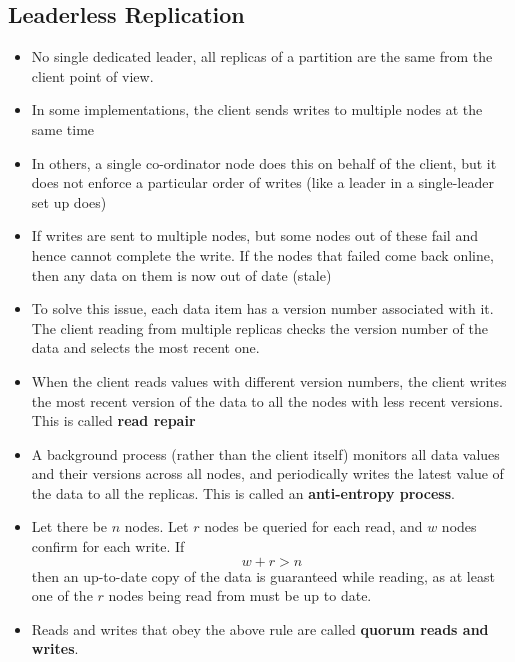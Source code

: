 \documentclass{article}
\begin{document}
\subsection{Leaderless Replication}
\begin{itemize}
    \item No single dedicated leader, all replicas of a partition are the same from the client point of view.
    
    \item In some implementations, the client sends writes to multiple nodes at the same time
    
    \item In others, a single co-ordinator node does this on behalf of the client, but it does not enforce a particular order of writes (like a leader in a single-leader set up does)
    
    \item If writes are sent to multiple nodes, but some nodes out of these fail and hence cannot complete the write. If the nodes that failed come back online, then any data on them is now out of date (stale)
    
    \item To solve this issue, each data item has a version number associated with it. The client reading from multiple replicas checks the version number of the data and selects the most recent one. 
    
    \item When the client reads values with different version numbers, the client writes the most recent version of the data to all the nodes with less recent versions. This is called \textbf{read repair}
    
    \item A background process (rather than the client itself) monitors all data values and their versions across all nodes, and periodically writes the latest value of the data to all the replicas. This is called an \textbf{anti-entropy process}.
    
    \item Let there be $n$ nodes. Let $r$ nodes be queried for each read, and $w$ nodes confirm for each write. If 
    \begin{equation*}
        w + r > n
    \end{equation*}
    then an up-to-date copy of the data is guaranteed while reading, as at least one of the $r$ nodes being read from must be up to date.
    
    \item Reads and writes that obey the above rule are called \textbf{quorum reads and writes}. 
\end{itemize}
\end{document}
